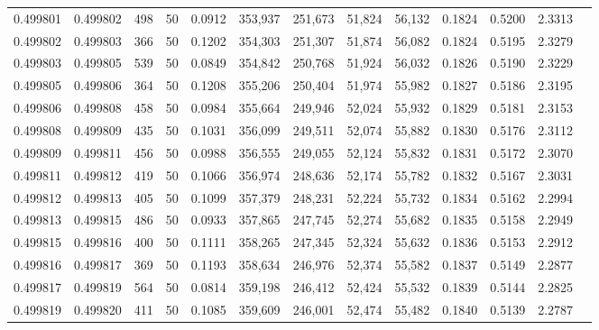 \begin{tabular}{rrrrrrrrrrrrr}
0.499801 & 0.499802 & 498 &  50 &                                     0.0912 & 353,937 & 251,673 &  51,824 &  56,132 & 0.1824 & 0.5200 & 2.3313 \\
0.499802 & 0.499803 & 366 &  50 &                                     0.1202 & 354,303 & 251,307 &  51,874 &  56,082 & 0.1824 & 0.5195 & 2.3279 \\
0.499803 & 0.499805 & 539 &  50 &                                     0.0849 & 354,842 & 250,768 &  51,924 &  56,032 & 0.1826 & 0.5190 & 2.3229 \\
0.499805 & 0.499806 & 364 &  50 &                                     0.1208 & 355,206 & 250,404 &  51,974 &  55,982 & 0.1827 & 0.5186 & 2.3195 \\
0.499806 & 0.499808 & 458 &  50 &                                     0.0984 & 355,664 & 249,946 &  52,024 &  55,932 & 0.1829 & 0.5181 & 2.3153 \\
0.499808 & 0.499809 & 435 &  50 &                                     0.1031 & 356,099 & 249,511 &  52,074 &  55,882 & 0.1830 & 0.5176 & 2.3112 \\
0.499809 & 0.499811 & 456 &  50 &                                     0.0988 & 356,555 & 249,055 &  52,124 &  55,832 & 0.1831 & 0.5172 & 2.3070 \\
0.499811 & 0.499812 & 419 &  50 &                                     0.1066 & 356,974 & 248,636 &  52,174 &  55,782 & 0.1832 & 0.5167 & 2.3031 \\
0.499812 & 0.499813 & 405 &  50 &                                     0.1099 & 357,379 & 248,231 &  52,224 &  55,732 & 0.1834 & 0.5162 & 2.2994 \\
0.499813 & 0.499815 & 486 &  50 &                                     0.0933 & 357,865 & 247,745 &  52,274 &  55,682 & 0.1835 & 0.5158 & 2.2949 \\
0.499815 & 0.499816 & 400 &  50 &                                     0.1111 & 358,265 & 247,345 &  52,324 &  55,632 & 0.1836 & 0.5153 & 2.2912 \\
0.499816 & 0.499817 & 369 &  50 &                                     0.1193 & 358,634 & 246,976 &  52,374 &  55,582 & 0.1837 & 0.5149 & 2.2877 \\
0.499817 & 0.499819 & 564 &  50 &                                     0.0814 & 359,198 & 246,412 &  52,424 &  55,532 & 0.1839 & 0.5144 & 2.2825 \\
0.499819 & 0.499820 & 411 &  50 &                                     0.1085 & 359,609 & 246,001 &  52,474 &  55,482 & 0.1840 & 0.5139 & 2.2787 \\

\end{tabular}
